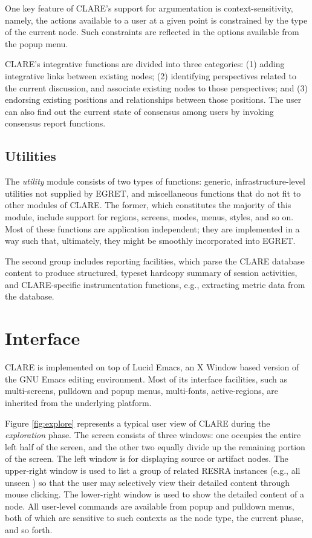One key feature of CLARE's support for argumentation is
context-sensitivity, namely, the actions available to a user at a given
point is constrained by the type of the current node. Such constraints are
reflected in the options available from the popup menu.

CLARE's integrative functions are divided into three categories: (1) adding
integrative links between existing nodes; (2) identifying perspectives
related to the current discussion, and associate existing nodes to those
perspectives; and (3) endorsing existing positions and relationships
between those positions. The user can also find out the current state of
consensus among users by invoking consensus report functions.


\subsection{Utilities}
\label{sec:utilities}

The {\it utility\/} module consists of two types of functions: generic,
infrastructure-level utilities not supplied by EGRET, and miscellaneous
functions that do not fit to other modules of CLARE. The former, which
constitutes the majority of this module, include support for regions,
screens, modes, menus, styles, and so on. Most of these functions are
application independent; they are implemented in a way such that,
ultimately, they might be smoothly incorporated into EGRET.

The second group includes reporting facilities, which parse the CLARE
database content to produce structured, typeset hardcopy summary of session
activities, and CLARE-specific instrumentation functions, e.g., extracting
metric data from the database.


\section{Interface}
\label{sec:interface}

CLARE is implemented on top of Lucid Emacs, an X Window based version of
the GNU Emacs editing environment. Most of its interface facilities, such
as multi-screens, pulldown and popup menus, multi-fonts, active-regions,
are inherited from the underlying platform.

Figure \ref{fig:explore} represents a typical user view of CLARE during the
{\it exploration\/} phase. The screen consists of three windows: one
occupies the entire left half of the screen, and the other two equally
divide up the remaining portion of the screen. The left window is for
displaying source or artifact nodes. The upper-right window is used to list
a group of related RESRA instances (e.g., all unseen )
so that the user may selectively view their detailed content through mouse
clicking. The lower-right window is used to show the detailed content of a
node.  All user-level commands are available from popup and pulldown menus,
both of which are sensitive to such contexts as the node type, the current
phase, and so forth.

